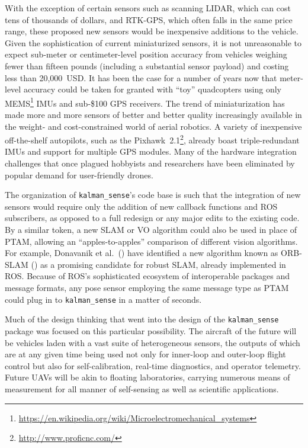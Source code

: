 With the exception of certain sensors such as scanning LIDAR, which can cost tens of thousands of dollars, and RTK-GPS, which often falls in the same price range, these proposed new sensors would be inexpensive additions to the vehicle. Given the sophistication of current miniaturized sensors, it is not unreasonable to expect sub-meter or centimeter-level position accuracy from vehicles weighing fewer than fifteen pounds (including a substantial sensor payload) and costing less than 20,000~USD. It has been the case for a number of years now that meter-level accuracy could be taken for granted with ``toy'' quadcopters using only MEMS\footnote{\url{https://en.wikipedia.org/wiki/Microelectromechanical_systems}} IMUs and sub-\$100 GPS receivers. The trend of miniaturization has made more and more sensors of better and better quality increasingly available in the weight- and cost-constrained world of aerial robotics. A variety of inexpensive off-the-shelf autopilots, such as the Pixhawk~2.1\footnote{\url{http://www.proficnc.com/}}, already boast triple-redundant IMUs and support for multiple GPS modules. Many of the hardware integration challenges that once plagued hobbyists and researchers have been eliminated by popular demand for user-friendly drones.

The organization of \texttt{kalman\_sense}'s code base is such that the integration of new sensors would require only the addition of new callback functions and ROS subscribers, as opposed to a full redesign or any major edits to the existing code. By a similar token, a new SLAM or VO algorithm could also be used in place of PTAM, allowing an ``apples-to-apples'' comparison of different vision algorithms. For example, Donavanik et al.\ (\cite{Donavanik2016}) have identified a new algorithm known as ORB-SLAM (\cite{Mur-Artal2015}) as a promising candidate for robust SLAM, already implemented in ROS. Because of ROS's sophisticated ecosystem of interoperable packages and message formats, any pose sensor employing the same message type as PTAM could plug in to \texttt{kalman\_sense} in a matter of seconds.

Much of the design thinking that went into the design of the \texttt{kalman\_sense} package was focused on this particular possibility. The aircraft of the future will be vehicles laden with a vast suite of heterogeneous sensors, the outputs of which are at any given time being used not only for inner-loop and outer-loop flight control but also for self-calibration, real-time diagnostics, and operator telemetry. Future UAVs will be akin to floating laboratories, carrying numerous means of measurement for all manner of self-sensing as well as scientific applications.

